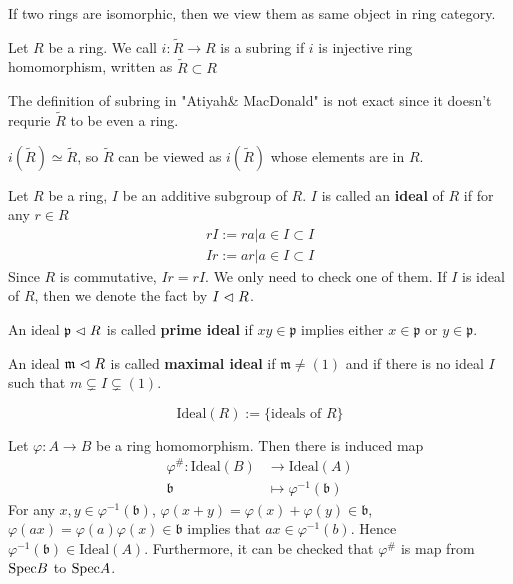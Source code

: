 \documentclass{amsart}
\begin{document}
If two rings are isomorphic, then we view them as same object in ring category.
\begin{secdefn}
Let $R$ be a ring. We call $i:\tilde{R}  \rightarrow R$ is a subring if $i$ is injective ring homomorphism, written as $\tilde{R} \subset R$
\end{secdefn}
\begin{rem}
	The definition of subring in "Atiyah\& MacDonald" is not exact since it doesn't requrie $\tilde{R}$ to be even a ring.
\end{rem}

\begin{rem}
	$i(\tilde{R}) \simeq \tilde{R}$, so $\tilde{R}$ can be viewed as $i(\tilde{R})$ whose elements are in $R$.
\end{rem}
\begin{secdefn}
	Let $R$ be a ring, $I$ be an additive subgroup of $R$. $I$ is called an \textbf{ideal} of $R$ if for any $r \in R$
\[
\begin{aligned}
&rI := { ra| a \in I} \subset I&\\
&Ir := { ar| a \in I} \subset I&
\end{aligned}
\]
Since $R$ is commutative, $Ir = rI$. We only need to check one of them. If $I$ is ideal of $R$, then we denote the fact by $I \vartriangleleft R$.

An ideal $\mathfrak{p} \vartriangleleft R$ is called \textbf{prime ideal} if $xy \in \mathfrak{p}$ implies either $x \in \mathfrak{p}$ or $ y \in \mathfrak{p}$.

An ideal $\mathfrak{m} \vartriangleleft R$ is called \textbf{maximal ideal} if $\mathfrak{m} \neq (1)$ and if there is no ideal $I$ such that $m \subsetneq I \subsetneq (1)$.
\end{secdefn}

\[
\text{Ideal}(R):= \bigl\{ \text{ideals of } R\bigr\}
\]

Let $\varphi: A \rightarrow B$ be a ring homomorphism. Then there is induced map
\[
\begin{aligned}
\varphi^{\#}: \text{Ideal}(B) &\rightarrow \text{Ideal}(A)\\
\mathfrak{b} &\mapsto \varphi^{-1}(\mathfrak{b})
\end{aligned}
\] 
For any $x,y \in \varphi^{-1}(\mathfrak{b})$, $\varphi(x+y)= \varphi(x) + \varphi(y) \in \mathfrak{b}$, $\varphi(ax)= \varphi(a)\varphi(x) \in \mathfrak{b}$ implies that $ax \in \varphi^{-1}(b)$. Hence $\varphi^{-1}(\mathfrak{b}) \in \text{Ideal}(A)$. Furthermore, it can be checked that $\varphi^{\#}$ is map from $\text{Spec} B$ to $\text{Spec} A$.
\end{document}
